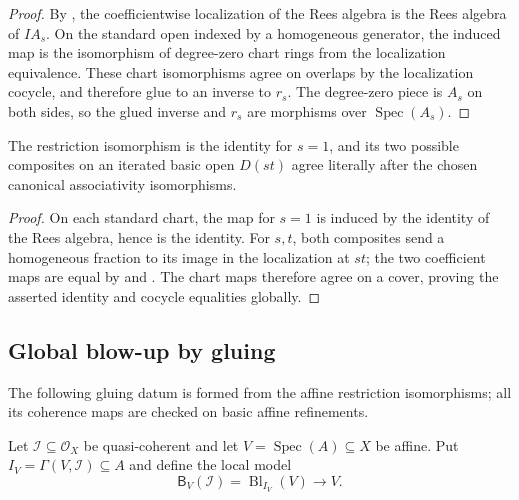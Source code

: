 \begin{proof}
  \leanok
  By , the coefficientwise localization
  of the Rees algebra is the Rees algebra of $IA_s$.  On the standard open
  indexed by a homogeneous generator, the induced map is the isomorphism of
  degree-zero chart rings from the localization equivalence.  These chart
  isomorphisms agree on overlaps by the localization cocycle, and therefore
  glue to an inverse to $r_s$.  The degree-zero piece is $A_s$ on both sides,
  so the glued inverse and $r_s$ are morphisms over $\operatorname{Spec}(A_s)$.
\end{proof}

\begin{lemma}
  \label{lemma:nagata-affine-blowup-restrict-cocycle}
  \leanok

  The restriction isomorphism is the identity for $s=1$, and its two possible
  composites on an iterated basic open $D(st)$ agree literally after the
  chosen canonical associativity isomorphisms.
\end{lemma}

\begin{proof}
  \leanok
  On each standard chart, the map for $s=1$ is induced by the identity of the
  Rees algebra, hence is the identity.  For $s,t$, both composites send a
  homogeneous fraction to its image in the localization at $st$; the two
  coefficient maps are equal by 
  and .
  The chart maps therefore agree on a cover, proving the asserted identity
  and cocycle equalities globally.
\end{proof}

\subsection{Global blow-up by gluing}

The following gluing datum is formed from the affine restriction isomorphisms;
all its coherence maps are checked on basic affine refinements.

\begin{definition}
  \label{def:nagata-global-blowup-local-model}
  \leanok

  Let $\mathcal I\subseteq\mathcal O_X$ be quasi-coherent and let
  $V=\operatorname{Spec}(A)\subseteq X$ be affine.  Put
  $I_V=\Gamma(V,\mathcal I)\subseteq A$ and define the local model
  \[
    \mathsf B_V(\mathcal I)=\operatorname{Bl}_{I_V}(V)\longrightarrow V.
  \]
\end{definition}

